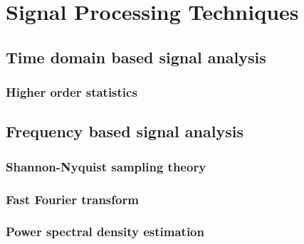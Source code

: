 \section{Signal Processing Techniques}
\subsection{Time domain based signal analysis}
\subsubsection{Higher order statistics}
\subsection{Frequency based signal analysis}
\subsubsection{Shannon-Nyquist sampling theory}
\subsubsection{Fast Fourier transform}
\subsubsection{Power spectral density estimation}


